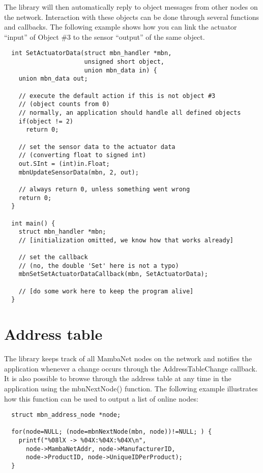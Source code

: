 The library will then automatically reply to object messages from other nodes on the network. Interaction with these objects can be done through several functions and callbacks. The following example shows how you can link the actuator ``input'' of Object \#3 to the sensor ``output'' of the same object.
\begin{verbatim}
  int SetActuatorData(struct mbn_handler *mbn,
                      unsigned short object,
                      union mbn_data in) {
    union mbn_data out;
    
    // execute the default action if this is not object #3
    // (object counts from 0)
    // normally, an application should handle all defined objects
    if(object != 2)
      return 0;

    // set the sensor data to the actuator data
    // (converting float to signed int)
    out.SInt = (int)in.Float;
    mbnUpdateSensorData(mbn, 2, out);
    
    // always return 0, unless something went wrong
    return 0;
  }
  
  int main() {
    struct mbn_handler *mbn;
    // [initialization omitted, we know how that works already]
    
    // set the callback
    // (no, the double 'Set' here is not a typo)
    mbnSetSetActuatorDataCallback(mbn, SetActuatorData);
    
    // [do some work here to keep the program alive]
  }
\end{verbatim}



\section{Address table}
The library keeps track of all MambaNet nodes on the network and notifies the application whenever a change occurs through the AddressTableChange callback. It is also possible to browse through the address table at any time in the application using the mbnNextNode() function. The following example illustrates how this function can be used to output a list of online nodes:
\begin{verbatim}
  struct mbn_address_node *node;

  for(node=NULL; (node=mbnNextNode(mbn, node))!=NULL; ) {
    printf("%08lX -> %04X:%04X:%04X\n",
      node->MambaNetAddr, node->ManufacturerID,
      node->ProductID, node->UniqueIDPerProduct);
  }
\end{verbatim}

